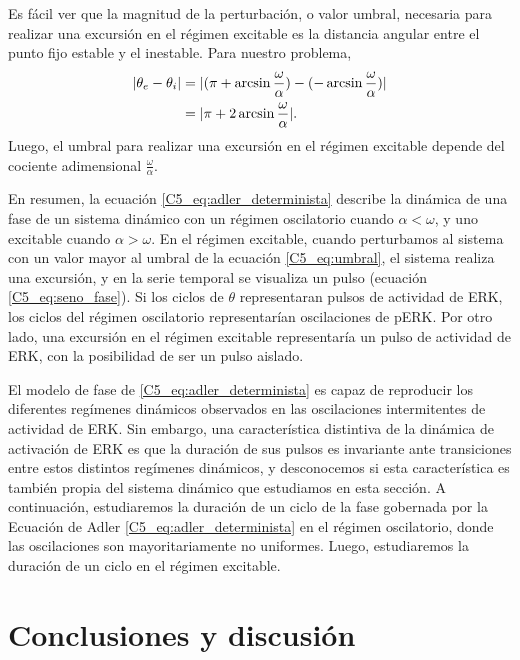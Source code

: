 \documentclass[./main.tex]{subfiles}
\begin{document}
Es fácil ver que la magnitud de la perturbación, o valor umbral, necesaria para realizar una excursión en el régimen excitable es la distancia angular entre el punto fijo estable y el inestable. Para nuestro problema,
\begin{align}
    |\theta_e - \theta_i| &= |(\pi + \arcsin{\frac{\omega}{\alpha}}) -  (-\arcsin{\frac{\omega}{\alpha}})| \\
    &= |\pi + 2 \arcsin{\frac{\omega}{\alpha}}|.
    \label{C5_eq:umbral}
\end{align}
Luego, el umbral para realizar una excursión en el régimen excitable depende del cociente adimensional $\frac{\omega}{\alpha}$. 


En resumen, la ecuación \ref{C5_eq:adler_determinista} describe la dinámica de una fase de un sistema dinámico con un régimen oscilatorio cuando $\alpha < \omega$, y uno excitable cuando $\alpha > \omega$. En el régimen excitable, cuando perturbamos al sistema con un valor mayor al umbral de la ecuación \ref{C5_eq:umbral}, el sistema realiza una excursión, y en la serie temporal se visualiza un pulso (ecuación \ref{C5_eq:seno_fase}). Si los ciclos de $\theta$ representaran pulsos de actividad de ERK, los ciclos del régimen oscilatorio representarían oscilaciones de pERK. Por otro lado, una excursión en el régimen excitable representaría un pulso de actividad de ERK, con la posibilidad de ser un pulso aislado.


El modelo de fase de \ref{C5_eq:adler_determinista} es capaz de reproducir los diferentes regímenes dinámicos observados en las oscilaciones intermitentes de actividad de ERK. Sin embargo, una característica distintiva de la dinámica de activación de ERK es que la duración de sus pulsos es invariante ante transiciones entre estos distintos regímenes dinámicos, y desconocemos si esta característica es también propia del sistema dinámico que estudiamos en esta sección. A continuación, estudiaremos la duración de un ciclo de la fase gobernada por la Ecuación de Adler  \ref{C5_eq:adler_determinista} en el régimen oscilatorio, donde las oscilaciones son mayoritariamente no uniformes. Luego, estudiaremos la duración de un ciclo en el régimen excitable. 






\section{Conclusiones y discusión}
\end{document}
